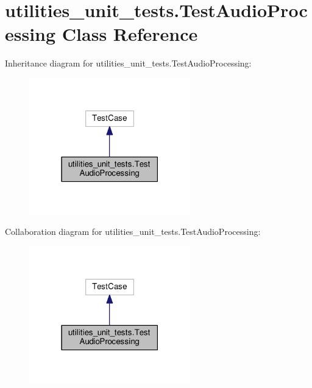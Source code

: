 \hypertarget{classutilities__unit__tests_1_1TestAudioProcessing}{\section{utilities\-\_\-unit\-\_\-tests.\-Test\-Audio\-Processing Class Reference}
\label{classutilities__unit__tests_1_1TestAudioProcessing}
}


Inheritance diagram for utilities\-\_\-unit\-\_\-tests.\-Test\-Audio\-Processing\-:
\nopagebreak
\begin{figure}[H]
\begin{center}
\leavevmode
\includegraphics[width=198pt]{classutilities__unit__tests_1_1TestAudioProcessing__inherit__graph}
\end{center}
\end{figure}


Collaboration diagram for utilities\-\_\-unit\-\_\-tests.\-Test\-Audio\-Processing\-:
\nopagebreak
\begin{figure}[H]
\begin{center}
\leavevmode
\includegraphics[width=198pt]{classutilities__unit__tests_1_1TestAudioProcessing__coll__graph}
\end{center}
\end{figure}
